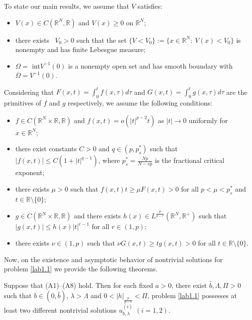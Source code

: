 \documentclass[reqno]{amsart}
\begin{document}
To state our main results, we assume that $V$ satisfies:
\begin{itemize}
\item[(A1)] $V(x)\in C(\mathbb{R}^N, \mathbb{R})$ and $V(x)\geq0$ on $\mathbb{R}^N$;

\item[(A2)] there exists ~$V_0>0$ such that the set
$\{V<V_0\}:=\{x\in\mathbb{R}^N: ~V(x)<V_0\}$ is nonempty and has finite Lebesgue measure;

\item[(A3)] $\Omega=$ int$V^{-1}(0)$ is a nonempty open set and has smooth boundary
 with $\overline{\Omega}=V^{-1}(0)$.
\end{itemize}
Considering that $F(x,t)=\int_0^tf(x,\tau)d\tau $ and $G(x,t)=\int_0^tg(x,\tau)d\tau$ 
are the primitives of $f$ and $g$ respectively, we assume the following conditions:
\begin{itemize}
\item[(A4)] $f\in C(\mathbb R^N\times\mathbb R, \mathbb R)$ and $f(x,t)=o(|t|^{p-2}t)$
as $|t|\to  0$ uniformly for $x\in \mathbb R^N$;

\item[(A5)] there exist constants $C>0$ and $q\in(p, p^*_s)$ such that
$|f(x,t)|\leq C(1+|t|^{q-1})$, where $p^*_s=\frac{Np}{N-sp}$ is the fractional 
critical exponent;

\item[(A6)] there exists $\mu>0$ such that $f(x,t)t\geq\mu F(x,t)>0$ for all 
$p<\mu<p^*_s$ and $t\in \mathbb R\setminus\{0\}$;

\item[(A7)] $g\in C(\mathbb R^N\times\mathbb R, \mathbb R)$ and there exists
$h(x)\in L^{\frac{p}{p-r}}(\mathbb R^N, \mathbb R^+)$ such that 
$|g(x,t)|\leq h(x)|t|^{r-1}$ for all $r\in(1,p)$;

\item[(A8)] there exists $\nu\in(1,p)$ such that $\nu G(x,t)\geq tg(x,t)>0$ for all
$t\in \mathbb R \setminus\{0\}$.
\end{itemize}

Now, on the existence and asymptotic behavior of nontrivial solutions for
problem \eqref{lab1.1} we provide the following theorems.

\begin{theorem} \label{thm1.1}
Suppose that {(A1)--(A8)} hold. Then for each fixed $a>0$, there exist
$\widehat{b}, \Lambda, \Pi>0$ such that $b\in(0,\widehat{b})$, $\lambda>\Lambda$ and 
$0<|h|_\frac{p}{p-r}<\Pi$, problem \eqref{lab1.1} possesses at least two different 
nontrivial solutions $u_{b,\lambda}^{(i)}$ $(i=1,2)$.
\end{theorem}
\end{document}
